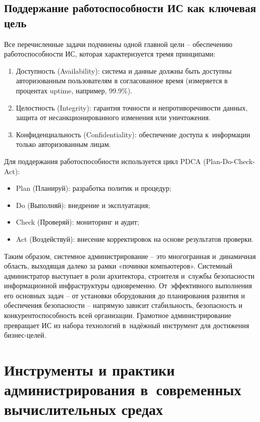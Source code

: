 \documentclass{ou}
\begin{document}
\subsection{Поддержание работоспособности ИС как ключевая цель}
Все перечисленные задачи подчинены одной главной цели -- обеспечению работоспособности ИС, которая характеризуется тремя принципами:
\begin{enumerate}[leftmargin=0em, itemindent=3.75em, nosep, label=\arabic*)]
\item Доступность (Availability): система и данные должны быть доступны авторизованным пользователям в согласованное время (измеряется в процентах uptime, например, 99.9\%).
\item Целостность (Integrity): гарантия точности и непротиворечивости данных, защита от несанкционированного изменения или уничтожения.
\item Конфиденциальность (Confidentiality): обеспечение доступа к~информации только авторизованным лицам.
\end{enumerate}

Для поддержания работоспособности используется цикл PDCA (Plan-Do-Check-Act):
\begin{itemize}[label=-, leftmargin=0em, itemindent=3.35em, nosep]
\item Plan (Планируй): разработка политик и процедур;
\item Do (Выполняй): внедрение и эксплуатация;
\item Check (Проверяй): мониторинг и аудит;
\item Act (Воздействуй): внесение корректировок на основе результатов проверки.
\end{itemize}

Таким образом, системное администрирование -- это многогранная и~динамичная область, выходящая далеко за рамки «починки компьютеров». Системный администратор выступает в роли архитектора, строителя и~службы безопасности информационной инфраструктуры одновременно. От~эффективного выполнения его основных задач -- от установки оборудования до планирования развития и обеспечения безопасности -- напрямую зависит стабильность, безопасность и конкурентоспособность всей организации. Грамотное администрирование превращает ИС из набора технологий в~надёжный инструмент для достижения бизнес-целей.
\newpage
\section{Инструменты и практики администрирования в~современных вычислительных средах}
\end{document}
